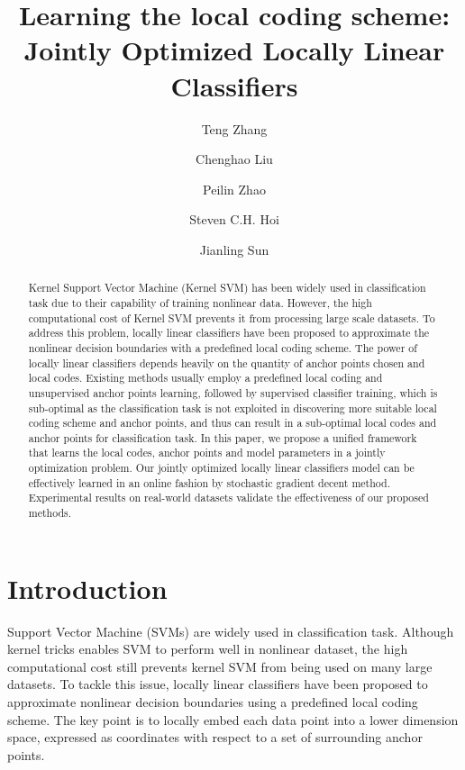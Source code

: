 \documentclass{llncs}
\begin{document}
	\title{Learning the local coding scheme: Jointly Optimized Locally Linear Classifiers }
	\author{Teng Zhang  \and Chenghao Liu  \and Peilin Zhao  \and Steven C.H. Hoi  \and Jianling Sun }
	\maketitle
	
	\begin{abstract}
		 Kernel Support Vector Machine (Kernel SVM) has been widely used in classification task due to their capability of training nonlinear data. However, the high computational cost of Kernel SVM prevents it from processing large scale datasets. To address this problem, locally linear classifiers have been proposed to approximate the nonlinear decision boundaries with a predefined local coding scheme. The power of locally linear classifiers depends heavily on the quantity of anchor points chosen and local codes. Existing methods usually employ a predefined local coding and unsupervised anchor points learning, followed by supervised classifier training, which is sub-optimal as the classification task is not exploited in discovering more suitable local coding scheme and anchor points,  and thus can result in a sub-optimal local codes and anchor points for classification task. In this paper, we propose a unified framework that learns the local codes, anchor points and model parameters in a jointly optimization problem. Our jointly optimized locally linear classifiers model can be effectively learned in an online fashion by stochastic gradient decent method. Experimental results on real-world datasets validate the effectiveness of our proposed methods. 
 	\end{abstract}
	
	\section{Introduction}
	Support Vector Machine (SVMs) are widely used in classification task. Although kernel tricks \cite{1} enables SVM to perform well in nonlinear dataset, the high computational cost still prevents kernel SVM from being used on many large datasets. To tackle this issue, locally linear classifiers \cite{2} \cite{3} have been proposed to approximate nonlinear decision boundaries using a predefined local coding scheme. The key point is to locally embed each data point into a lower dimension space, expressed as coordinates with respect to a set of surrounding anchor points.
	
\end{document}
